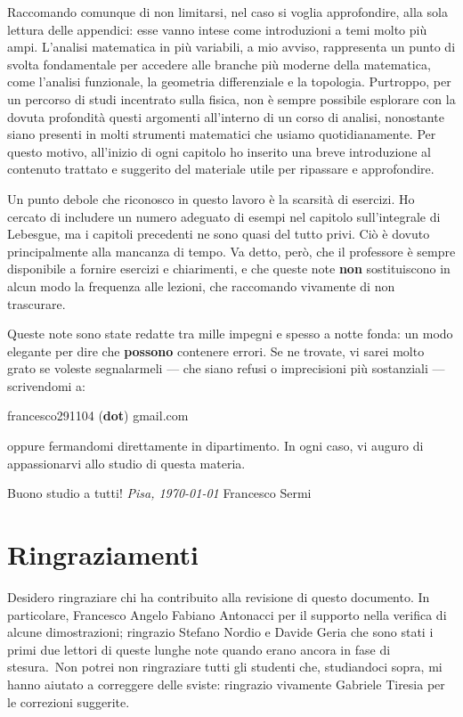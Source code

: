\documentclass[12pt, twoside, italian]{book}
\begin{document}
	Raccomando comunque di non limitarsi, nel caso si voglia approfondire, alla sola lettura delle appendici: esse vanno intese come introduzioni a temi molto più ampi. L'analisi matematica in più variabili, a mio avviso, rappresenta un punto di svolta fondamentale per accedere alle branche più moderne della matematica, come l'analisi funzionale, la geometria differenziale e la topologia. Purtroppo, per un percorso di studi incentrato sulla fisica, non è sempre possibile esplorare con la dovuta profondità questi argomenti all'interno di un corso di analisi, nonostante siano presenti in molti strumenti matematici che usiamo quotidianamente. Per questo motivo, all'inizio di ogni capitolo ho inserito una breve introduzione al contenuto trattato e suggerito del materiale utile per ripassare e approfondire.\

	Un punto debole che riconosco in questo lavoro è la scarsità di esercizi. Ho cercato di includere un numero adeguato di esempi nel capitolo sull'integrale di Lebesgue, ma i capitoli precedenti ne sono quasi del tutto privi. Ciò è dovuto principalmente alla mancanza di tempo. Va detto, però, che il professore è sempre disponibile a fornire esercizi e chiarimenti, e che queste note \textbf{non} sostituiscono in alcun modo la frequenza alle lezioni, che raccomando vivamente di non trascurare.\


	Queste note sono state redatte tra mille impegni e spesso a notte fonda: un modo elegante per dire che \textbf{possono} contenere errori. Se ne trovate, vi sarei molto grato se voleste segnalarmeli — che siano refusi o imprecisioni più sostanziali — scrivendomi a:
	\begin{center}
	francesco291104 (\textbf{dot}) gmail.com
	\end{center}

	oppure fermandomi direttamente in dipartimento. In ogni caso, vi auguro di appassionarvi allo studio di questa materia.

	Buono studio a tutti! 
	\vspace{1cm}
	\emph{Pisa, \today} \hfill Francesco Sermi
	
	\section*{Ringraziamenti}
	Desidero ringraziare chi ha contribuito alla revisione di questo documento. In particolare, Francesco Angelo Fabiano Antonacci per il supporto nella verifica di alcune dimostrazioni; ringrazio Stefano Nordio e Davide Geria che sono stati i primi due lettori di queste lunghe note quando erano ancora in fase di stesura.\
	Non potrei non ringraziare tutti gli studenti che, studiandoci sopra, mi hanno aiutato a correggere delle sviste: ringrazio vivamente Gabriele Tiresia per le correzioni suggerite.
	\vfill
	\cleardoublepage
\end{document}
